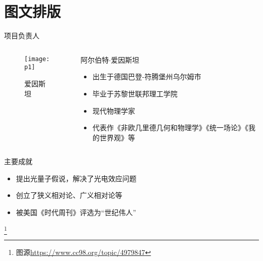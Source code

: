 \documentclass[utf8]{beamer}
\begin{document}
	\section{图文排版}
	\begin{frame}{\qquad 项目负责人}
		\begin{columns}
			\begin{column}{.4\linewidth}
				\begin{figure}[h]
					\centering
					\texttt{[image: p1]}
					\caption{爱因斯坦}
					\label{fig:1}
				\end{figure}	
			\end{column}
			\begin{column}{.7\linewidth}	
				{\color{darkblue}阿尔伯特$\cdot$爱因斯坦}
				\begin{itemize}
					\item 出生于德国巴登-符腾堡州乌尔姆市
					\item \alert{毕业于苏黎世联邦理工学院}
					\item 现代物理学家
					\item 代表作《非欧几里德几何和物理学》《统一场论》《我的世界观》等
				\end{itemize}
			\end{column}
		\end{columns}
		\vspace{3ex}
		{\color{darkblue}主要成就}
		\begin{itemize}
			\item 提出\alert{光量子假说}，解决了\alert{光电效应问题}
			\item 创立了狭义相对论、广义相对论等
			\item 被美国《时代周刊》评选为\alert{“世纪伟人”}
		\end{itemize}
		\footnote{图源\href{https://www.cc98.org/topic/4979847}{https://www.cc98.org/topic/4979847}}
	\end{frame}
	
\end{document}
